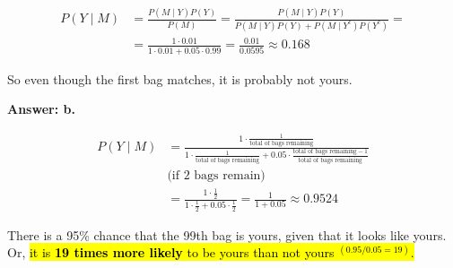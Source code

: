 \documentclass[12pt]{beamer}
\begin{document}
{\begin{frame}{}
{\[
\begin{aligned}
P(Y\mid M)&=\frac{P(M\mid Y)P(Y)}{P(M)}
          =\frac{P(M\mid Y)P(Y)}
                 {P(M\mid Y)P(Y)+P(M\mid Y^c)P(Y^c)}=\\
&=\frac{1\cdot 0.01}{1\cdot 0.01+0.05\cdot 0.99}
=\frac{0.01}{0.0595}\approx 0.168
\end{aligned}
\]

So even though the first bag matches, it is probably not yours.
}
\end{frame}

\begin{frame}{}
\textbf{Answer: b.}
{\color{blue}
\footnotesize
\[
\begin{aligned}
P(Y\mid M)
&=\frac{1\cdot \tfrac{1}{\text{total of bags remaining}}}
       {1\cdot \tfrac{1}{\text{total of bags remaining}} + 0.05\cdot \tfrac{\text{total of bags remaining} - 1}{\text{total of bags remaining}}}\\
&\text{(if 2 bags remain)}\\
&=\frac{1\cdot \tfrac{1}{2}}
       {1\cdot \tfrac{1}{2} + 0.05\cdot \tfrac{1}{2}}=\frac{1}{1+0.05} \approx 0.9524
\end{aligned}
\]

There is a 95\% chance that the 99th bag is yours, given that it looks like yours.\\
Or, \hl{it is \textbf{19 times more likely} to be yours than not yours $^{(0.95/0.05 = 19)}$.}
}
\end{frame}
}
\end{document}
